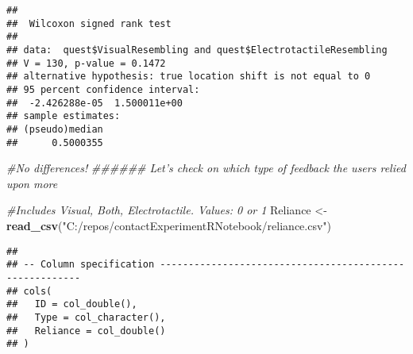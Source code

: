 \documentclass[
]{article}
\newenvironment{Shaded}{\begin{snugshade}}{\end{snugshade}}
\newcommand{\CommentTok}[1]{\textcolor[rgb]{0.56,0.35,0.01}{\textit{#1}}}
\newcommand{\DataTypeTok}[1]{\textcolor[rgb]{0.13,0.29,0.53}{#1}}
\newcommand{\KeywordTok}[1]{\textcolor[rgb]{0.13,0.29,0.53}{\textbf{#1}}}
\newcommand{\NormalTok}[1]{#1}
\newcommand{\OperatorTok}[1]{\textcolor[rgb]{0.81,0.36,0.00}{\textbf{#1}}}
\newcommand{\OtherTok}[1]{\textcolor[rgb]{0.56,0.35,0.01}{#1}}
\newcommand{\StringTok}[1]{\textcolor[rgb]{0.31,0.60,0.02}{#1}}
\begin{document}
\begin{Shaded}
\end{Shaded}

\begin{verbatim}
## 
##  Wilcoxon signed rank test
## 
## data:  quest$VisualResembling and quest$ElectrotactileResembling
## V = 130, p-value = 0.1472
## alternative hypothesis: true location shift is not equal to 0
## 95 percent confidence interval:
##  -2.426288e-05  1.500011e+00
## sample estimates:
## (pseudo)median 
##      0.5000355
\end{verbatim}

\begin{Shaded}
\begin{Highlighting}[]
\CommentTok{#No differences!}
\CommentTok{###### Let's check on which type of feedback the users relied upon more}

\CommentTok{#Includes Visual, Both, Electrotactile. Values: 0 or 1}
\NormalTok{Reliance <-}\StringTok{ }\KeywordTok{read_csv}\NormalTok{(}\StringTok{"C:/repos/contactExperimentRNotebook/reliance.csv"}\NormalTok{)}
\end{Highlighting}
\end{Shaded}

\begin{verbatim}
## 
## -- Column specification --------------------------------------------------------
## cols(
##   ID = col_double(),
##   Type = col_character(),
##   Reliance = col_double()
## )
\end{verbatim}

\begin{Shaded}
\end{Shaded}
\end{document}
